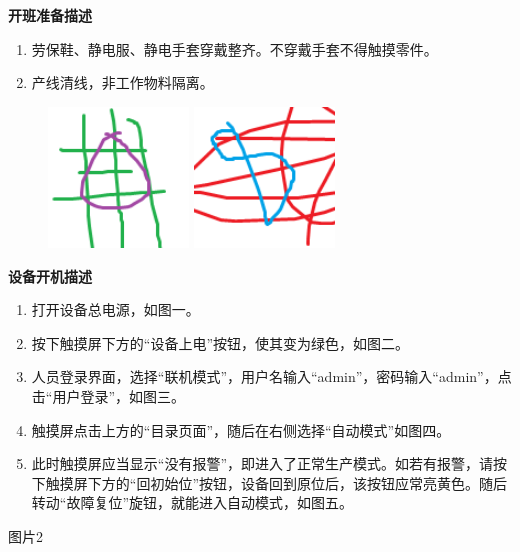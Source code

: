 \documentclass[UTF8]{ctexart}
\newcommand{\smalltitle}[1]{{\zihao{4}\bfseries{#1}}\\}
\begin{document}
\centering
\begin{boxedminipage}{184.6mm}
\centering
\smalltitle{开班准备描述}
\begin{boxedminipage}[t]{101.84mm}
\begin{enumerate}
\item 劳保鞋、静电服、静电手套穿戴整齐。不穿戴手套不得触摸零件。
\item 产线清线，非工作物料隔离。
\end{enumerate}
\end{boxedminipage}
\hfill
\begin{boxedminipage}[t]{78.76mm}
\begin{figure}[H]
\parbox[t]{37.38mm}{
\includegraphics[width=37.38mm]{pic01}
\caption{}}
\hfill
\parbox[t]{37.38mm}{
\includegraphics[width=37.38mm]{pic02}
\caption{}}
\end{figure}
\end{boxedminipage}
\end{boxedminipage}

\begin{boxedminipage}{184.6mm}
\centering
\smalltitle{设备开机描述}
\begin{boxedminipage}[t]{101.84mm}
\begin{enumerate}
\item 打开设备总电源，如图一。
\item 按下触摸屏下方的“设备上电”按钮，使其变为绿色，如图二。
\item 人员登录界面，选择“联机模式”，用户名输入“admin”，密码输入“admin”，点击“用户登录”，如图三。
\item 触摸屏点击上方的“目录页面”，随后在右侧选择“自动模式”如图四。
\item 此时触摸屏应当显示“没有报警”，即进入了正常生产模式。如若有报警，请按下触摸屏下方的“回初始位”按钮，设备回到原位后，该按钮应常亮黄色。随后转动“故障复位”旋钮，就能进入自动模式，如图五。
\end{enumerate}
\end{boxedminipage}
\hfill
\begin{boxedminipage}[t]{78.76mm}
图片2
\end{boxedminipage}
\end{boxedminipage}
\end{document}
